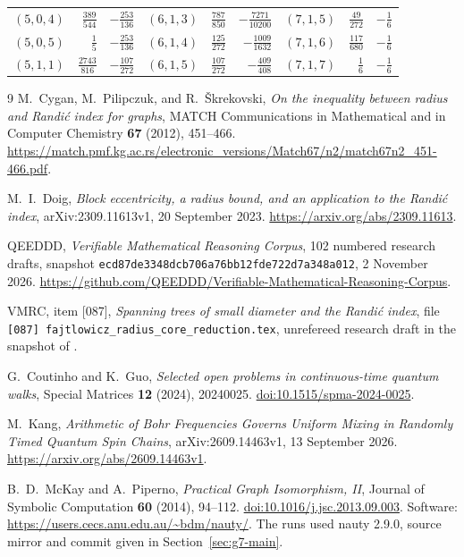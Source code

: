 \documentclass[11pt,a4paper]{article}
\theoremstyle{definition}\newtheorem{definition}[theorem]{Definition}
\theoremstyle{remark}\newtheorem{remark}[theorem]{Remark}
\begin{document}
\begin{center}
\begin{tabular}{crr@{\qquad}crr@{\qquad}crr}
$(5,0,4)$ & $\frac{389}{544}$ & $-\frac{253}{136}$ & $(6,1,3)$ & $\frac{787}{850}$ & $-\frac{7271}{10200}$ & $(7,1,5)$ & $\frac{49}{272}$ & $-\frac{1}{6}$\\[2pt]
$(5,0,5)$ & $\frac{1}{5}$ & $-\frac{253}{136}$ & $(6,1,4)$ & $\frac{125}{272}$ & $-\frac{1009}{1632}$ & $(7,1,6)$ & $\frac{117}{680}$ & $-\frac{1}{6}$\\[2pt]
$(5,1,1)$ & $\frac{2743}{816}$ & $-\frac{107}{272}$ & $(6,1,5)$ & $\frac{107}{272}$ & $-\frac{409}{408}$ & $(7,1,7)$ & $\frac{1}{6}$ & $-\frac{1}{6}$\\[2pt]
\bottomrule\end{tabular}\end{center}

\begingroup\small\setlength{\parskip}{0pt}
\begin{thebibliography}{9}
\setlength{\itemsep}{3pt}
M.~Cygan, M.~Pilipczuk, and R.~\v{S}krekovski,
\emph{On the inequality between radius and Randi\'c index for graphs},
MATCH Communications in Mathematical and in Computer Chemistry
\textbf{67} (2012), 451--466.
\url{https://match.pmf.kg.ac.rs/electronic_versions/Match67/n2/match67n2_451-466.pdf}.

M.~I.~Doig, \emph{Block eccentricity, a radius bound, and an application
to the Randi\'c index}, arXiv:2309.11613v1, 20 September 2023.
\url{https://arxiv.org/abs/2309.11613}.

QEEDDD, \emph{Verifiable Mathematical Reasoning Corpus},
102 numbered research drafts, snapshot
\texttt{ecd87de3348dcb706a76bb12fde722d7a348a012}, 2 November 2026.
\url{https://github.com/QEEDDD/Verifiable-Mathematical-Reasoning-Corpus}.

VMRC, item [087], \emph{Spanning trees of small diameter and the
Randi\'c index}, file
\texttt{[087] fajtlowicz\_radius\_core\_reduction.tex},
unrefereed research draft in the snapshot of \cite{Corpus}.

G.~Coutinho and K.~Guo,
\emph{Selected open problems in continuous-time quantum walks},
Special Matrices \textbf{12} (2024), 20240025.
\href{https://doi.org/10.1515/spma-2024-0025}{doi:10.1515/spma-2024-0025}.

M.~Kang, \emph{Arithmetic of Bohr Frequencies Governs Uniform Mixing
in Randomly Timed Quantum Spin Chains}, arXiv:2609.14463v1,
13 September 2026.
\url{https://arxiv.org/abs/2609.14463v1}.

B.~D.~McKay and A.~Piperno,
\emph{Practical Graph Isomorphism, II}, Journal of Symbolic Computation
\textbf{60} (2014), 94--112.
\href{https://doi.org/10.1016/j.jsc.2013.09.003}{doi:10.1016/j.jsc.2013.09.003}.
Software: \url{https://users.cecs.anu.edu.au/~bdm/nauty/}.
The runs used nauty 2.9.0, source mirror and commit given in
Section~\ref{sec:g7-main}.
\end{thebibliography}
\endgroup
\end{document}
